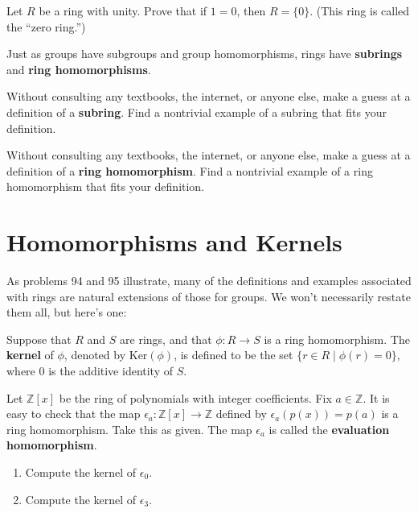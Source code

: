 \begin{problem}
Let \(R\) be a ring with unity. Prove that if \(1=0\), then \(R = \{0\}\). (This ring is called the ``zero ring.'')
\end{problem}

Just as groups have subgroups and group homomorphisms, rings have \textbf{subrings} and \textbf{ring homomorphisms}.

\begin{problem}
Without consulting any textbooks, the internet, or anyone else, make a guess at a definition of a \textbf{subring}. Find a nontrivial example of a subring that fits your definition.
\end{problem}

\begin{problem}
Without consulting any textbooks, the internet, or anyone else, make a guess at a definition of a \textbf{ring homomorphism}. Find a nontrivial example of a ring homomorphism that fits your definition.
\end{problem}

\section{Homomorphisms and Kernels}
As problems 94 and 95 illustrate, many of the definitions and examples associated with rings are natural extensions of those for groups. We won't necessarily restate them all, but here's one:

\begin{definition}
Suppose that \(R\) and \(S\) are rings, and that \(\phi : R \longrightarrow S\) is a ring homomorphism. The \textbf{kernel} of \(\phi\), denoted by \(\mbox{Ker}( \phi )\), is defined to be the
set \(\{r \in R \mid \phi(r) = 0 \} \), where \(0\) is the additive identity of \(S\).
\end{definition}

\begin{problem}
Let \(\mathbb{Z}[x]\)  be the ring of polynomials with integer coefficients. Fix \(a\in \mathbb{Z}\). It is easy to check that the map \(\epsilon_a : \mathbb{Z}[x] \longrightarrow \mathbb{Z}\) defined by \(\epsilon_a(p(x)) = p(a)\) is a ring homomorphism. Take this as given. The map \(\epsilon_a\) is called the \textbf{evaluation homomorphism}.
\begin{enumerate}
  \item Compute the kernel of \(\epsilon_0\).
  \item Compute the kernel of \(\epsilon_3\).
\end{enumerate}
\end{problem}

